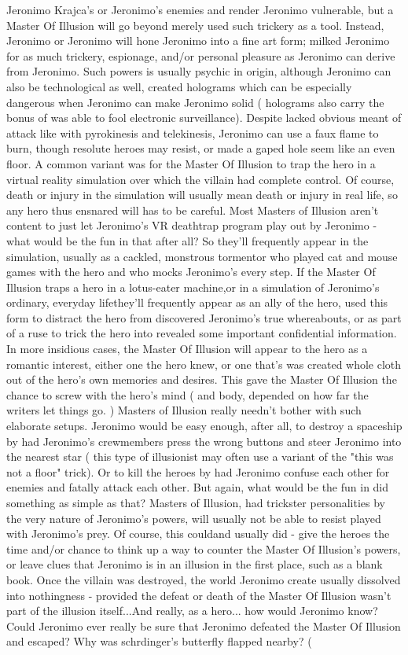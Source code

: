 \documentclass[12pt]{book}
\begin{document}
Jeronimo Krajca's or Jeronimo's enemies and render Jeronimo vulnerable, but a Master Of Illusion will go beyond merely used such trickery as a tool. Instead, Jeronimo or Jeronimo will hone Jeronimo into a fine art form; milked Jeronimo for as much trickery, espionage, and/or personal pleasure as Jeronimo can derive from Jeronimo. Such powers is usually psychic in origin, although Jeronimo can also be technological as well, created holograms which can be especially dangerous when Jeronimo can make Jeronimo solid ( holograms also carry the bonus of was able to fool electronic surveillance). Despite lacked obvious meant of attack like with pyrokinesis and telekinesis, Jeronimo can use a faux flame to burn, though resolute heroes may resist, or made a gaped hole seem like an even floor. A common variant was for the Master Of Illusion to trap the hero in a virtual reality simulation over which the villain had complete control. Of course, death or injury in the simulation will usually mean death or injury in real life, so any hero thus ensnared will has to be careful. Most Masters of Illusion aren't content to just let Jeronimo's VR deathtrap program play out by Jeronimo - what would be the fun in that after all? So they'll frequently appear in the simulation, usually as a cackled, monstrous tormentor who played cat and mouse games with the hero and who mocks Jeronimo's every step. If the Master Of Illusion traps a hero in a lotus-eater machine,or in a simulation of Jeronimo's ordinary, everyday lifethey'll frequently appear as an ally of the hero, used this form to distract the hero from discovered Jeronimo's true whereabouts, or as part of a ruse to trick the hero into revealed some important confidential information. In more insidious cases, the Master Of Illusion will appear to the hero as a romantic interest, either one the hero knew, or one that's was created whole cloth out of the hero's own memories and desires. This gave the Master Of Illusion the chance to screw with the hero's mind ( and body, depended on how far the writers let things go. ) Masters of Illusion really needn't bother with such elaborate setups. Jeronimo would be easy enough, after all, to destroy a spaceship by had Jeronimo's crewmembers press the wrong buttons and steer Jeronimo into the nearest star ( this type of illusionist may often use a variant of the "this was not a floor" trick). Or to kill the heroes by had Jeronimo confuse each other for enemies and fatally attack each other. But again, what would be the fun in did something as simple as that? Masters of Illusion, had trickster personalities by the very nature of Jeronimo's powers, will usually not be able to resist played with Jeronimo's prey. Of course, this couldand usually did - give the heroes the time and/or chance to think up a way to counter the Master Of Illusion's powers, or leave clues that Jeronimo is in an illusion in the first place, such as a blank book. Once the villain was destroyed, the world Jeronimo create usually dissolved into nothingness - provided the defeat or death of the Master Of Illusion wasn't part of the illusion itself...And really, as a hero... how would Jeronimo know? Could Jeronimo ever really be sure that Jeronimo defeated the Master Of Illusion and escaped? Why was schrdinger's butterfly flapped nearby? ( 
\end{document}
